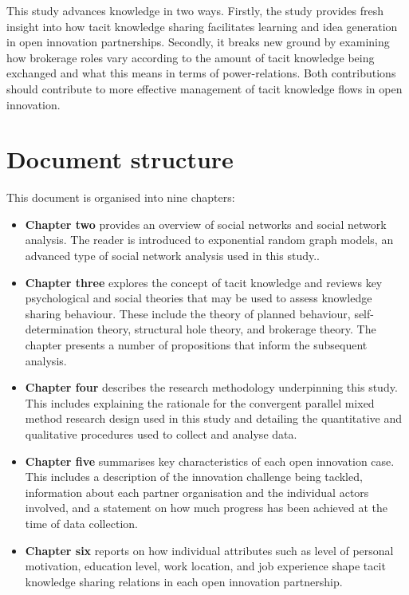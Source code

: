 This study advances knowledge in two ways. Firstly, the study provides fresh insight into how tacit knowledge sharing facilitates learning and idea generation in open innovation partnerships. Secondly, it breaks new ground by examining how brokerage roles vary according to the amount of tacit knowledge being exchanged and what this means in terms of power-relations. Both contributions should contribute to more effective management of tacit knowledge flows in open innovation. \medskip

\section{Document structure}

This document is organised into nine chapters:

\begin{itemize}[leftmargin=0pt]
  \item[] \textbf{Chapter two} provides an overview of social networks and social network analysis. The reader is introduced to exponential random graph models, an advanced type of social network analysis used in this study..
  
  \item[] \textbf{Chapter three} explores the concept of tacit knowledge and reviews key psychological and social theories that may be used to assess knowledge sharing behaviour. These include the theory of planned behaviour, self-determination theory, structural hole theory, and brokerage theory. The chapter presents a number of propositions that inform the subsequent analysis.
  
  \item[] \textbf{Chapter four} describes the research methodology underpinning this study. This includes explaining the rationale for the convergent parallel mixed method research design used in this study and detailing the quantitative and qualitative procedures used to collect and analyse data.
  
  \item[] \textbf{Chapter five} summarises key characteristics of each open innovation case. This includes a description of the innovation challenge being tackled, information about each partner organisation and the individual actors involved, and a statement on how much progress has been achieved at the time of data collection.
  
  \item[] \textbf{Chapter six} reports on how individual attributes such as level of personal motivation, education level, work location, and job experience shape tacit knowledge sharing relations in each open innovation partnership.
  

\end{itemize}
